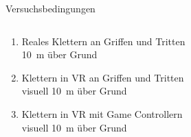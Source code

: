 \begin{frame}{Versuchsbedingungen}
\begin{columns}
	\begin{column}{0.5\textwidth}
		\begin{enumerate}[label=\textbf\textcolor{tertiary}{\Alph*}]
			\item Reales Klettern an Griffen und Tritten
			\\\textcolor{source}{\SI{10}{\meter} über Grund}
			\item Klettern in \gls{VR} an Griffen und Tritten
			\\\textcolor{source}{visuell \SI{10}{\meter} über Grund}
			\item Klettern in \gls{VR} mit Game Controllern
			\\\textcolor{source}{visuell \SI{10}{\meter} über Grund}
		\end{enumerate}
	\end{column}
	\begin{column}{0.5\textwidth}
		\begin{center}
			\vspace*{-15mm}

\end{center}
\end{column}
\end{columns}
\end{frame}
